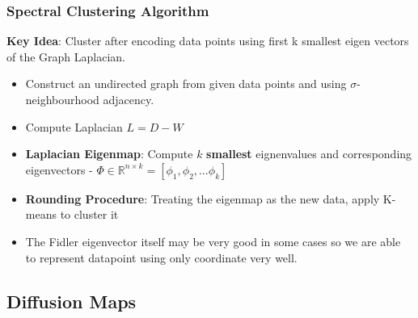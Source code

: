 \documentclass{article}
\begin{document}
\subsubsection{Spectral Clustering Algorithm}
\textbf{Key Idea}: Cluster after encoding data points using first k smallest eigen vectors of the Graph Laplacian.
\begin{itemize}
    \item Construct an undirected graph from given data points and using $\sigma$- neighbourhood adjacency.
    \item Compute Laplacian $L=D-W$
    \item \textbf{Laplacian Eigenmap}:  Compute $k$ \textbf{smallest} eignenvalues and corresponding eigenvectors - $\Phi \in \mathbb{R}^{n \times k} = [\phi_1, \phi_2, \dots \phi_k]$
    \item \textbf{Rounding Procedure}: Treating the eigenmap as the new data, apply K-means to cluster it
    \item The Fidler eigenvector itself may be very good in some cases so we are able to represent datapoint using only coordinate very well.
\end{itemize}


\subsection{Diffusion Maps}
\end{document}

